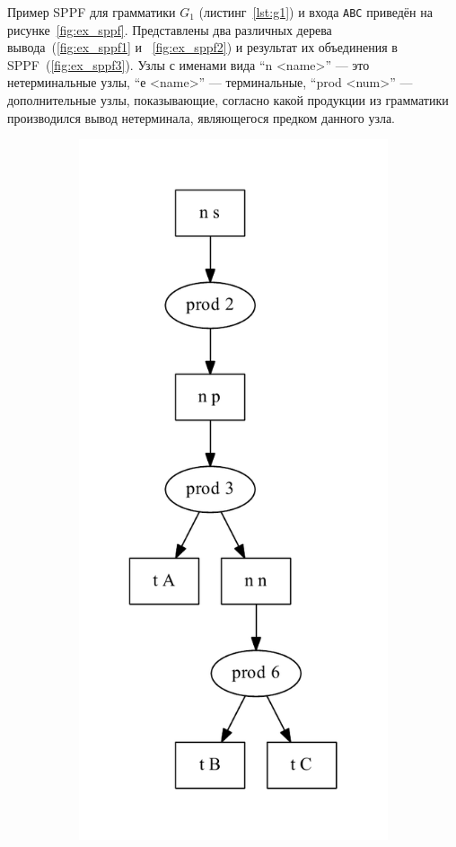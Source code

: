 Пример SPPF для грамматики $G_1$ (листинг~\ref{lst:g1}) и входа \verb|ABC| приведён на рисунке~\ref{fig:ex_sppf}. Представлены два различных дерева вывода~(\ref{fig:ex_sppf1} и ~\ref{fig:ex_sppf2}) и результат их объединения в SPPF~(\ref{fig:ex_sppf3}). Узлы с именами вида ``n <name>'' --- это нетерминальные узлы, ``е <name>'' --- терминальные, ``prod <num>'' --- дополнительные узлы, показывающие, согласно какой продукции из грамматики производился вывод нетерминала, являющегося предком данного узла.  

\begin{figure}[h!]
\centering
   \begin{subfigure}[b]{0.3\textwidth}
       \includegraphics[width=\textwidth]{pics/ex_sppf1}

\end{subfigure}
\end{figure}
